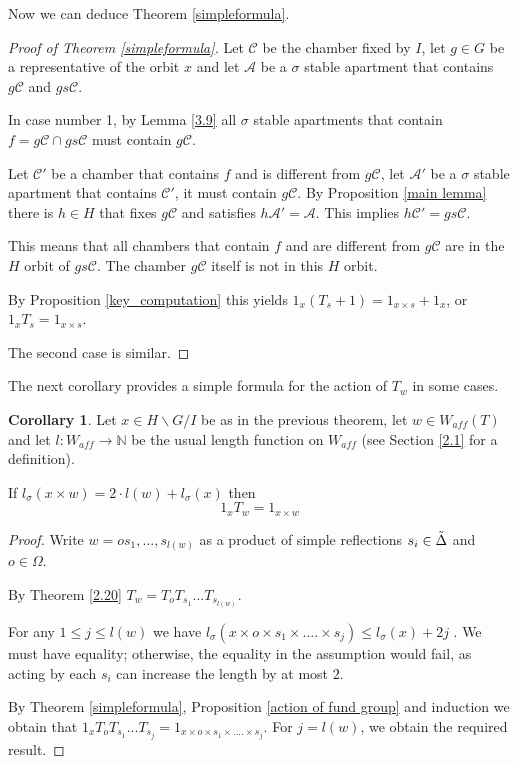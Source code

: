 \documentclass[12pt]{article}
\newcommand{\A}{\mathcal{A}}
\newcommand{\C}{\mathcal{C}}
\newcommand{\<}{\langle}
\renewcommand{\>}{\rangle}
\theoremstyle{plain}
\theoremstyle{definition}
\newtheorem{cor}[theorem]{Corollary}
\begin{document}
Now we can deduce Theorem \ref{simpleformula}.

\begin{proof}[Proof of Theorem \ref{simpleformula}]
Let $\C$ be the chamber fixed by $I$, let $g\in G$ be a representative of the orbit $x$ and let $\A$ be a $\sigma$ stable apartment that contains $g\C$ and $gs\C$.

In case number 1, by Lemma \ref{3.9} all $\sigma$ stable apartments that contain $f=g\C\cap gs\C$ must contain $g\C$. 

Let $\C'$ be a chamber that contains $f$ and is different from $g\C$, let $\A'$ be a $\sigma$ stable apartment that contains $\C'$, it must contain $g\C$. By Proposition \ref{main lemma} there is $h\in H$ that fixes $g\C$ and satisfies $h\A'=\A$. This implies $h\C'=gs\C$.

This means that all chambers that contain $f$ and are different from $g\C$ are in the $H$ orbit of $gs\C$. The chamber $g\C$ itself is not in this $H$ orbit.

By Proposition \ref{key_computation} this yields $1_x(T_s+1)=1_{x\times s}+1_x$, or $1_xT_s=1_{x\times s}$.

The second case is similar.
\end{proof}

The next corollary provides a simple formula for the action of $T_w$ in some cases.

\begin{cor}\label{3.10}
Let $x\in H\backslash G/I$ be as in the previous theorem, let $w\in W_{aff}(T)$ and let $l:W_{aff}\rightarrow \mathbb{N}$ be the usual length function on $W_{aff}$ (see Section \ref{2.1} for a definition).

If $l_\sigma(x\times w)=2\cdot l(w)+l_\sigma(x)$ then 
\begin{equation*}
    1_xT_w=1_{x\times w}
\end{equation*}

\end{cor}

\begin{proof}
Write $w=os_1,...,s_{l(w)}$ as a product of simple reflections $s_i\in\Tilde{\Delta}$ and $o\in \Omega$. 

By Theorem \ref{2.20}  $T_w=T_oT_{s_1}...T_{s_{l(w)}}$. 

For any $1\leq j\leq l(w)$ we have $l_\sigma(x\times o \times s_1\times ....\times s_j)\leq l_\sigma(x)+2j$
. We must have equality; otherwise, the equality in the assumption would fail, as acting by each $s_i$ can increase the length by at most $2$.

By Theorem \ref{simpleformula}, Proposition \ref{action of fund group} and induction we obtain that $1_xT_oT_{s_1}...T_{s_j}=1_{x\times o \times s_1\times ....\times s_j}.$ For $j=l(w)$, we obtain the required result.
\end{proof}
\end{document}
